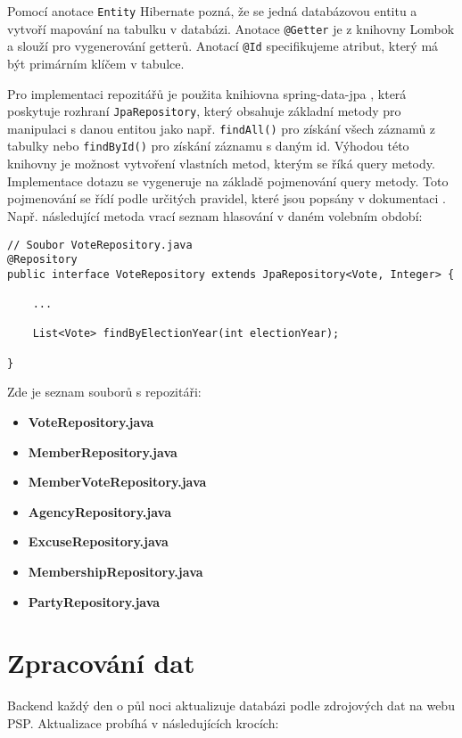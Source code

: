 Pomocí anotace \lstinline|Entity| Hibernate pozná, že se jedná databázovou entitu a vytvoří mapování na tabulku v databázi. Anotace \lstinline|@Getter| je z knihovny Lombok a slouží pro vygenerování getterů. Anotací \lstinline|@Id| specifikujeme atribut, který má být primárním klíčem v tabulce. 

Pro implementaci repozitářů je použita knihiovna spring-data-jpa \cite{spring-jpa}, která poskytuje rozhraní \lstinline|JpaRepository|, který obsahuje základní metody pro manipulaci s danou entitou jako např. \lstinline|findAll()| pro získání všech záznamů z tabulky nebo \lstinline|findById()| pro získání záznamu s daným id. Výhodou této knihovny je možnost vytvoření vlastních metod, kterým se říká query metody. Implementace dotazu se vygeneruje na základě pojmenování query metody. Toto pojmenování se řídí podle určitých pravidel, které jsou popsány v dokumentaci \cite{spring-jpa}. Např. následující metoda vrací seznam hlasování v daném volebním období:

\begin{lstlisting}[caption={Repozitář pro hlasování}, label={lst:be-repository-vote}, tabsize=2]
// Soubor VoteRepository.java
@Repository
public interface VoteRepository extends JpaRepository<Vote, Integer> {
	
	...
	
	List<Vote> findByElectionYear(int electionYear);
	
}
\end{lstlisting}

\noindent Zde je seznam souborů s repozitáři:

\begin{itemize}
	\item \textbf{VoteRepository.java}
	\item \textbf{MemberRepository.java}
	\item \textbf{MemberVoteRepository.java}
	\item \textbf{AgencyRepository.java}
	\item \textbf{ExcuseRepository.java}
	\item \textbf{MembershipRepository.java}
	\item \textbf{PartyRepository.java}
\end{itemize}

\section{Zpracování dat}
Backend každý den o půl noci aktualizuje databázi podle zdrojových dat na webu PSP. Aktualizace probíhá v následujících krocích:

